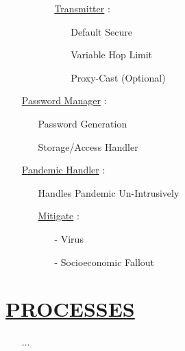 \documentclass[11pt]{article}
\begin{document}
\begin{enumerate}
\begin{enumerate}
\begin{enumerate}
			\item[] \ul{Transmitter}  :
			\begin{enumerate}
				\item[] Default Secure
				\item[] Variable Hop Limit
				\item[] Proxy-Cast (Optional)
			\end{enumerate}
		\end{enumerate}
	\end{enumerate}
	
	\item[] \ul{Password Manager} :
	\begin{enumerate}
		\item[] Password Generation
		\item[] Storage/Access Handler
	\end{enumerate}
	
	\item[] \ul{Pandemic Handler} :
	\begin{enumerate}
		\item[] Handles Pandemic Un-Intrusively
		
		\item[] \ul{Mitigate} :
		\begin{enumerate}
			\item[-] Virus
			\item[-] Socioeconomic Fallout
		\end{enumerate}
	\end{enumerate}
	
\end{enumerate}


\section*{\ul{PROCESSES}}
\begin{enumerate}
	\item[] ...
\end{enumerate}
\end{document}
